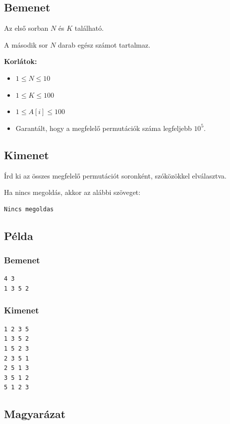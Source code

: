 \documentclass[12pt,a4paper]{article}
\begin{document}
\subsection*{Bemenet}

Az első sorban $N$ és $K$ található.

A második sor $N$ darab egész számot tartalmaz.

\textbf{Korlátok:}
\begin{itemize}
    \item $1 \le N \le 10$
    \item $1 \le K \le 100$
    \item $1 \le A[i] \le 100$
    \item Garantált, hogy a megfelelő permutációk száma legfeljebb $10^5$.
\end{itemize}

\subsection*{Kimenet}

Írd ki az összes megfelelő permutációt soronként, szóközökkel elválasztva.

Ha nincs megoldás, akkor az alábbi szöveget:
\begin{verbatim}
Nincs megoldas
\end{verbatim}

\subsection*{Példa}

\subsubsection*{Bemenet}
\begin{verbatim}
4 3
1 3 5 2
\end{verbatim}

\subsubsection*{Kimenet}
\begin{verbatim}
1 2 3 5
1 3 5 2
1 5 2 3
2 3 5 1
2 5 1 3
3 5 1 2
5 1 2 3
\end{verbatim}

\subsection*{Magyarázat}
\end{document}
